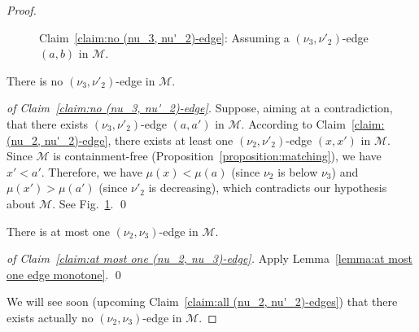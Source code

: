 \documentclass[a4paper]{llncs}
\begin{document}
\begin{proof}
\begin{figure}[t!]
    \caption{\label{fig:subfig:no (nu_3, nu'_2)-edge}%
      Claim~\ref{claim:no (nu_3, nu'_2)-edge}:
      Assuming a $(\nu_3, \nu'_2)$-edge $(a, b)$ in $\mathcal{M}$.
    }
  \end{figure}

  \begin{claim}
    \label{claim:no (nu_3, nu'_2)-edge}
    There is no $(\nu_3, \nu'_2)$-edge in $\mathcal{M}$.
  \end{claim}

  \begin{proof}[of Claim~\ref{claim:no (nu_3, nu'_2)-edge}]
    Suppose, aiming at a contradiction, that there exists
    $(\nu_3, \nu'_2)$-edge $(a, a')$ in $\mathcal{M}$.
    According to Claim~\ref{claim:(nu_2, nu'_2)-edge}, there
    exists at least one $(\nu_2, \nu'_2)$-edge $(x, x')$ in $\mathcal{M}$.
    Since $\mathcal{M}$ is containment-free (Proposition~\ref{proposition:matching}),
    we have $x' < a'$.
    Therefore,
    we have $\mu(x) < \mu(a)$ (since $\nu_2$ is below $\nu_3$) and
    $\mu(x') > \mu(a')$ (since $\nu'_2$ is decreasing),
    which contradicts our hypothesis about $\mathcal{M}$.
    See Fig.~\ref{fig:subfig:no (nu_3, nu'_2)-edge}.
    \qed
  \end{proof}

  \begin{claim}
    \label{claim:at most one (nu_2, nu_3)-edge}
    There is at most one $(\nu_2, \nu_3)$-edge
    in $\mathcal{M}$.
  \end{claim}

  \begin{proof}[of Claim~\ref{claim:at most one (nu_2, nu_3)-edge}]
    Apply Lemma~\ref{lemma:at most one edge monotone}.
    \qed
  \end{proof}

    We will see soon (upcoming Claim~\ref{claim:all (nu_2, nu'_2)-edges})
    that there exists actually no $(\nu_2, \nu_3)$-edge
    in $\mathcal{M}$.


\end{proof}
\end{document}
